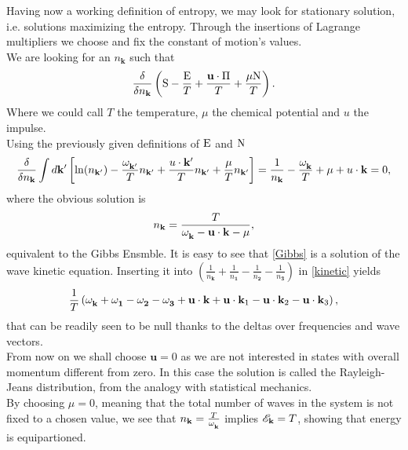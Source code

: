 Having now a working definition of entropy, we may look for stationary solution, i.e. solutions maximizing the entropy. Through the insertions of Lagrange 
multipliers we choose and fix the constant of motion's values.  \\
We are looking for an $n_\mathbf{k}$ such that 
\begin{equation}
    \frac{\delta}{\delta n_\mathbf{k}}\left( \mathrm{S} - \frac{\mathrm{E}}{T} + \frac{\mathbf{u} \cdot \Pi}{T} + \frac{\mu \mathrm{N}}{T} \right).
\end{equation}
Where we could call $T$ the temperature, $\mu$ the chemical potential and $u$ the impulse. \\
Using the previously given definitions of $\mathrm{E}$ and $\mathrm{N}$ 
\begin{equation}
    \frac{\delta}{\delta n_\mathbf{k}} \int d\mathbf{k'} \left[ \ln(n_\mathbf{k'}) -\frac{\omega^{}_\mathbf{k'}}{T}n_\mathbf{k'} + 
    \frac{u \cdot \mathbf{k'}}{T}n_\mathbf{k'}+\frac{\mu}{T} n_\mathbf{k'} \right] = 
    \frac{1}{n_\mathbf{k}} - \frac{\omega^{}_{\mathbf{k}}}{T} + \mu  +  u \cdot \mathbf{k}= 0,
\end{equation} 
where the obvious solution is 
\begin{equation}
    n_\mathbf{k} = \frac{T}{\omega^{}_{\mathbf{k}} - \mathbf{u} \cdot \mathbf{k} - \mu},
    \label{Gibbs}
\end{equation}
equivalent to the Gibbs Ensmble. It is easy to see that \eqref{Gibbs} is a solution of the wave kinetic equation. Inserting it into $\left( \frac{1}{n_\mathbf{k}} 
+ \frac{1}{n_\mathbf{1}}-\frac{1}{n_\mathbf{2}}-\frac{1}{n_\mathbf{3}}\right)$ in \eqref{kinetic} yields
\begin{equation}
    \frac{1}{T}\left( \omega^{}_{\mathbf{k}} +\omega^{}_\mathbf{1}-\omega^{}_\mathbf{2}-\omega^{}_\mathbf{3} + \mathbf{u} \cdot \mathbf{k} +\mathbf{u} \cdot \mathbf{k}_1 
    -\mathbf{u} \cdot \mathbf{k}_2 -\mathbf{u} \cdot \mathbf{k}_3 \right), 
\end{equation}
that can be readily seen to be null thanks to the deltas over frequencies and wave vectors.\\
From now on we shall choose $\mathbf{u} = 0$ as we are not interested in states with overall momentum different from zero. In this case the solution is called  the 
Rayleigh-Jeans distribution, from the analogy with statistical mechanics.\\
By choosing $\mu = 0$, meaning that the total number of waves in the system is not fixed to a 
chosen value, we see that $n_\mathbf{k} = \frac{T}{\omega^{}_{\mathbf{k}}}$ implies $\mathscr{E}_\mathbf{k} = T$, showing that energy is equipartioned.\\
